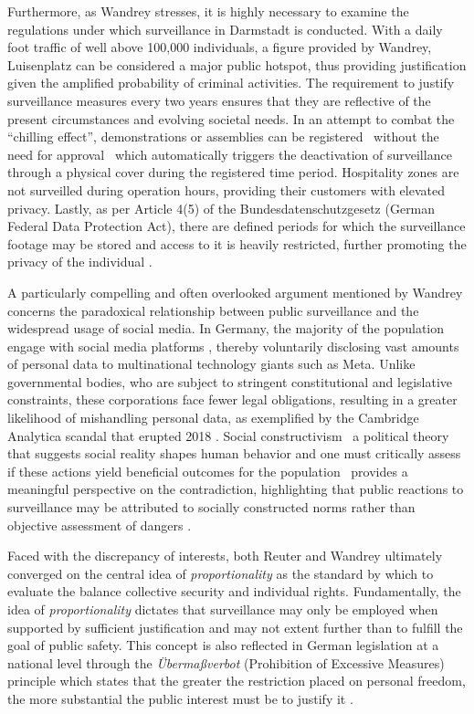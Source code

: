 \documentclass[12pt]{article}
\begin{document}
	Furthermore, as Wandrey stresses, it is highly necessary to examine the regulations under which surveillance in Darmstadt is conducted. With a daily foot traffic of well above 100,000 individuals, a figure provided by Wandrey, Luisenplatz can be considered a major public hotspot, thus providing justification given the amplified probability of criminal activities. The requirement to justify surveillance measures every two years ensures that they are reflective of the present circumstances and evolving societal needs. In an attempt to combat the ``chilling effect'', demonstrations or assemblies can be registered \textemdash\ without the need for approval \textemdash\ which automatically triggers the deactivation of surveillance through a physical cover during the registered time period. Hospitality zones are not surveilled during operation hours, providing their customers with elevated privacy. Lastly, as per Article 4(5) of the Bundesdatenschutzgesetz (German Federal Data Protection Act), there are defined periods for which the surveillance footage may be stored and access to it is heavily restricted, further promoting the privacy of the individual \parencite{gesetzeimInternet_BDSG4}. 
	
	A particularly compelling and often overlooked argument mentioned by Wandrey concerns the paradoxical relationship between public surveillance and the widespread usage of social media. In Germany, the majority of the population engage with social media platforms \parencite{koptyug2025, worldometer_germany2025}, thereby voluntarily disclosing vast amounts of personal data to multinational technology giants such as Meta. Unlike governmental bodies, who are subject to stringent constitutional and legislative constraints, these corporations face fewer legal obligations, resulting in a greater likelihood of mishandling personal data, as exemplified by the Cambridge Analytica scandal that erupted 2018 \parencite{harbath_cambridge_2023}. Social constructivism \textemdash\ a political theory that suggests social reality shapes human behavior and one must critically assess if these actions yield beneficial outcomes for the population \textemdash\ provides a meaningful perspective on the contradiction, highlighting that public reactions to surveillance may be attributed to socially constructed norms rather than objective assessment of dangers \parencite{courseCompanion2024}. 
	
	Faced with the discrepancy of interests, both Reuter and Wandrey ultimately converged on the central idea of \textit{proportionality} as the standard by which to evaluate the balance collective security and individual rights. Fundamentally, the idea of \textit{proportionality} dictates that surveillance may only be employed when supported by sufficient justification and may not extent further than to fulfill the goal of public safety. This concept is also reflected in German legislation at a national level through the \textit{Übermaßverbot} (Prohibition of Excessive Measures) principle which states that the greater the restriction placed on personal freedom, the more substantial the public interest must be to justify it \parencite{wetzling2023}.
	
\end{document}
